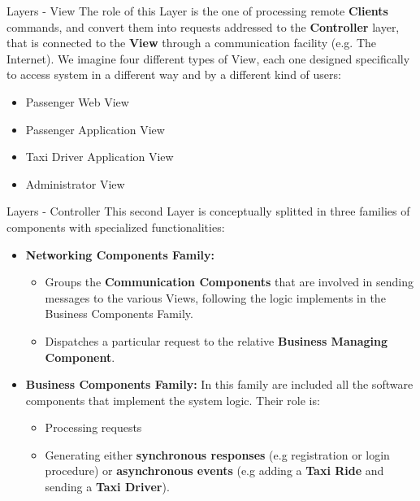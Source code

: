 \documentclass{../common/latex_classes/pdf_presentation}
\begin{document}
	\begin{frame}{Layers - View}
		The role of this Layer is the one of processing remote \textbf{Clients} commands, and convert them into requests addressed to the \textbf{Controller} layer, that is connected to the \textbf{View} through a communication facility (e.g. The Internet).
		We imagine four different types of View, each one designed specifically to access \myTaxiService{} system in a different way and by a different kind of users:
		\begin{itemize}
			\item Passenger Web View
			\item Passenger Application View
			\item Taxi Driver Application View
			\item Administrator View
		\end{itemize}
	\end{frame}
	
	\begin{frame}{Layers - Controller}
		This second Layer is conceptually splitted in three families of components with specialized functionalities:
		\begin{itemize}
			\item \textbf{Networking Components Family:}
			\begin{itemize}
				\item Groups the \textbf{Communication Components} that are involved in sending messages to the various Views, following the logic implements in the Business Components Family. 
				\item Dispatches a particular request to the relative \textbf{Business Managing Component}.
			\end{itemize}
			\item \textbf{Business Components Family:} In this family are included all the software components that implement the system logic.
			Their role is:
			\begin{itemize}
				\item Processing requests 
				\item Generating either \textbf{synchronous responses} (e.g registration or login procedure) or \textbf{asynchronous events} (e.g adding a \textbf{Taxi Ride} and sending a \textbf{Taxi Driver}).
			\end{itemize}
		\end{itemize}
	\end{frame}
	
\end{document}

